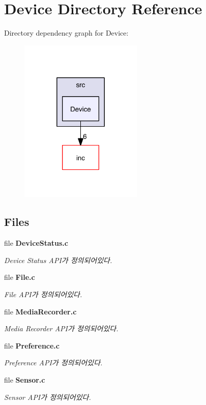 \section{Device Directory Reference}
\label{dir_57214c2eadffd92c3463393f4cd1de64}
Directory dependency graph for Device\-:
\nopagebreak
\begin{figure}[H]
\begin{center}
\leavevmode
\includegraphics[width=166pt]{dir_57214c2eadffd92c3463393f4cd1de64_dep}
\end{center}
\end{figure}
\subsection*{Files}
\begin{DoxyCompactItemize}
\item 
file {\bf Device\-Status.\-c}
\begin{DoxyCompactList}\small\item\em Device Status A\-P\-I가 정의되어있다. \end{DoxyCompactList}\item 
file {\bf File.\-c}
\begin{DoxyCompactList}\small\item\em File A\-P\-I가 정의되어있다. \end{DoxyCompactList}\item 
file {\bf Media\-Recorder.\-c}
\begin{DoxyCompactList}\small\item\em Media Recorder A\-P\-I가 정의되어있다. \end{DoxyCompactList}\item 
file {\bf Preference.\-c}
\begin{DoxyCompactList}\small\item\em Preference A\-P\-I가 정의되어있다. \end{DoxyCompactList}\item 
file {\bf Sensor.\-c}
\begin{DoxyCompactList}\small\item\em Sensor A\-P\-I가 정의되어있다. \end{DoxyCompactList}\end{DoxyCompactItemize}

